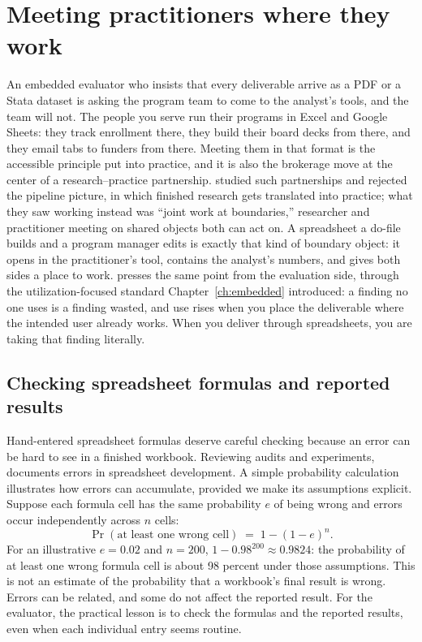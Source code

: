 \documentclass[
    a4paper,
    fontsize=10pt,
    twoside=true,
    numbers=noenddot,
]{kaobook}
\begin{document}
\section{Meeting practitioners where they work}\label{sec:ch11-rationale}
An embedded evaluator who insists that every deliverable arrive as a PDF or a Stata dataset is asking the program team to come to the analyst's tools, and the team will not. The people you serve run their programs in Excel and Google Sheets: they track enrollment there, they build their board decks from there, and they email tabs to funders from there. Meeting them in that format is the accessible principle put into practice, and it is also the brokerage move at the center of a research--practice partnership. \textcite{penuel2015partnerships} studied such partnerships and rejected the pipeline picture, in which finished research gets translated into practice; what they saw working instead was \enquote{joint work at boundaries,} researcher and practitioner meeting on shared objects both can act on. A spreadsheet a do-file builds and a program manager edits is exactly that kind of boundary object: it opens in the practitioner's tool, contains the analyst's numbers, and gives both sides a place to work. \textcite{patton2008utilization} presses the same point from the evaluation side, through the utilization-focused standard Chapter~\ref{ch:embedded} introduced: a finding no one uses is a finding wasted, and use rises when you place the deliverable where the intended user already works. When you deliver through spreadsheets, you are taking that finding literally.

\subsection{Checking spreadsheet formulas and reported results}\label{sec:ch11-spreadsheet-risk}
Hand-entered spreadsheet formulas deserve careful checking because an error can be hard to see in a finished workbook. Reviewing audits and experiments, \textcite{panko1998errors} documents errors in spreadsheet development. A simple probability calculation illustrates how errors can accumulate, provided we make its assumptions explicit. Suppose each formula cell has the same probability $e$ of being wrong and errors occur independently across $n$ cells:
\[
\Pr(\text{at least one wrong cell}) \;=\; 1-(1-e)^{n}.
\]
For an illustrative $e=0.02$ and $n=200$, $1-0.98^{200}\approx0.9824$: the probability of at least one wrong formula cell is about 98 percent under those assumptions. This is not an estimate of the probability that a workbook's final result is wrong. Errors can be related, and some do not affect the reported result. For the evaluator, the practical lesson is to check the formulas and the reported results, even when each individual entry seems routine.
\end{document}
